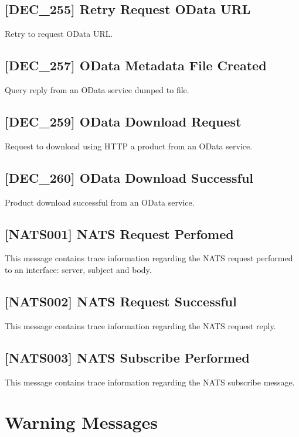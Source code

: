 \documentclass[dec_sum_main.tex]{subfiles}
\begin{document}
\subsection{[DEC\_255] Retry Request OData URL}
Retry to request OData URL.

\label{DEC257}
\subsection{[DEC\_257] OData Metadata File  Created}
Query reply from an OData service dumped to file.

\label{DEC259}
\subsection{[DEC\_259] OData Download Request}
Request to download using HTTP a product from an OData service.

\label{DEC260}
\subsection{[DEC\_260] OData Download Successful}
Product download successful from an OData service.

\label{NATS001}
\subsection{[NATS001] NATS Request Perfomed}
This message contains trace information regarding the NATS request performed to an interface: server, subject and body.

\label{NATS002}
\subsection{[NATS002] NATS Request Successful}
This message contains trace information regarding the NATS request reply.

\label{NATS003}
\subsection{[NATS003] NATS Subscribe Performed}
This message contains trace information regarding the NATS subscribe message.

\newpage

\section{Warning Messages}
\end{document}
